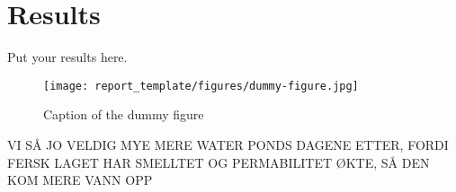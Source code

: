 \section{Results} \label{sec:results}

Put your results here.

\begin{figure}[thbp]
    \centering
    \texttt{[image: report\_template/figures/dummy-figure.jpg]}
    \caption{Caption of the dummy figure}
    \label{fig:dummy_figure}
\end{figure}


VI SÅ JO VELDIG MYE MERE WATER PONDS DAGENE ETTER, FORDI FERSK LAGET HAR SMELLTET OG PERMABILITET ØKTE, SÅ DEN KOM MERE VANN OPP
